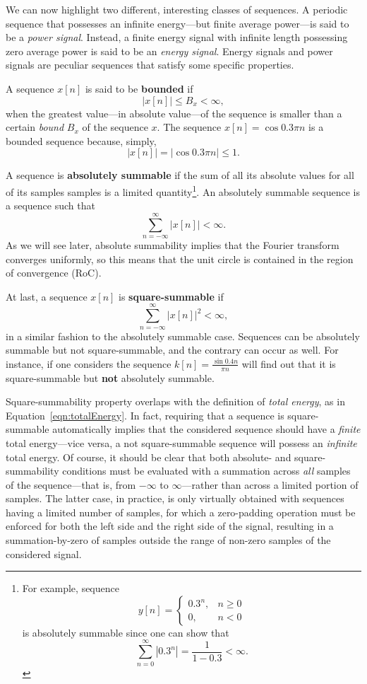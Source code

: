 \documentclass[\documentfontsize, twocolumn]{\classname}
\begin{document}
We can now highlight two different, interesting classes of sequences. A periodic se\-quen\-ce that possesses an infinite energy---but finite average power---is said to be a \emph{power signal}. Instead, a finite energy signal with infinite length possessing zero average power is said to be an \emph{energy signal}. Energy signals and power signals are peculiar se\-quen\-ces that satisfy some specific properties.

A se\-quen\-ce $x[n]$ is said to be \textbf{bounded} if \[|x[n]| \leq B_x < \infty,\] when the greatest value---in absolute value---of the se\-quen\-ce is smaller than a certain \emph{bound} $B_x$ of the se\-quen\-ce $x$. The se\-quen\-ce $x[n] = \cos{0.3\pi n}$ is a bounded se\-quen\-ce because, simply, \[|x[n]| = |\cos{0.3\pi n}| \leq 1.\]

A se\-quen\-ce is \textbf{absolutely summable} if the sum of all its absolute values for all of its samples samples is a limited quantity\footnote{For example, se\-quen\-ce \[y[n] = \left\{\begin{array}{lc} 0.3^n, & n \geq 0 \\ 0, & n < 0\end{array}\right.\] is absolutely summable since one can show that \[ \sum_{n=0}^\infty |0.3^n| = \frac{1}{1 - 0.3} < \infty.\]}. An absolutely summable sequence is a sequence such that
\begin{equation}\label{eqn:absolutelySummableSequence}
    \sum_{n=-\infty}^{\infty}|x[n]| < \infty.
\end{equation}
As we will see later, absolute summability implies that the Fourier transform converges uniformly, so this means that the unit circle is contained in the region of convergence (RoC).

At last, a se\-quen\-ce $x[n]$ is \textbf{square-summable} if  \[\sum_{n=-\infty}^{\infty}|x[n]|^2 < \infty,\] in a similar fashion to the absolutely summable case. Se\-quen\-ces can be absolutely summable but not squa\-re-sum\-ma\-ble, and the contrary can occur as well. For instance, if one considers the se\-quen\-ce $k[n] = \frac{\sin{0.4n}}{\pi n}$ will find out that it is squa\-re-sum\-ma\-ble but \textbf{not} absolutely summable.

Square-summability property overlaps with the definition of \emph{total energy}, as in Equation~\ref{eqn:totalEnergy}. In fact, requiring that a sequence is square-summable automatically implies that the considered sequence should have a \emph{finite} total energy---vice versa, a not square-summable sequence will possess an \emph{infinite} total energy. Of course, it should be clear that both absolute- and square-summability conditions must be evaluated with a summation across \emph{all} samples of the sequence---that is, from $-\infty$ to $\infty$---rather than across a limited portion of samples. The latter case, in practice, is only virtually obtained with sequences having a limited number of samples, for which a zero-padding operation must be enforced for both the left side and the right side of the signal, resulting in a summation-by-zero of samples outside the range of non-zero samples of the considered signal.
\end{document}
